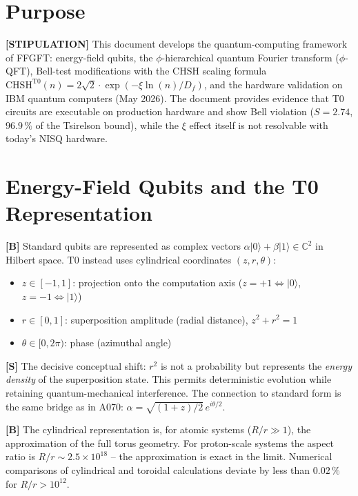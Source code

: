 \section{Purpose}

\textbf{[STIPULATION]} This document develops the quantum-computing framework of
FFGFT: energy-field qubits, the $\phi$-hierarchical quantum Fourier transform
($\phi$-QFT), Bell-test modifications with the CHSH scaling formula
$\text{CHSH}^{\text{T0}}(n) = 2\sqrt{2}\cdot\exp(-\xi\ln(n)/D_f)$, and the
hardware validation on IBM quantum computers (May 2026). The document provides
evidence that T0 circuits are executable on production hardware and show Bell
violation ($S=2{.}74$, $96{.}9\,\%$ of the Tsirelson bound), while the $\xi$
effect itself is not resolvable with today's NISQ hardware.

\section{Energy-Field Qubits and the T0 Representation}

\textbf{[B]} Standard qubits are represented as complex vectors
$\alpha|0\rangle+\beta|1\rangle\in\mathbb{C}^2$ in Hilbert space. T0 instead
uses cylindrical coordinates $(z,r,\theta)$:

\begin{itemize}[leftmargin=2em,itemsep=2pt,topsep=2pt]
  \item $z\in[-1,1]$: projection onto the computation axis ($z=+1
        \Leftrightarrow|0\rangle$, $z=-1\Leftrightarrow|1\rangle$)
  \item $r\in[0,1]$: superposition amplitude (radial distance), $z^2+r^2=1$
  \item $\theta\in[0,2\pi)$: phase (azimuthal angle)
\end{itemize}

\textbf{[S]} The decisive conceptual shift: $r^2$ is not a probability but
represents the \emph{energy density} of the superposition state. This permits
deterministic evolution while retaining quantum-mechanical interference. The
connection to standard form is the same bridge as in A070:
$\alpha=\sqrt{(1+z)/2}\,e^{i\theta/2}$.

\textbf{[B]} The cylindrical representation is, for atomic systems ($R/r\gg1$),
the approximation of the full torus geometry. For proton-scale systems the aspect
ratio is $R/r\sim2{.}5\times10^{18}$ -- the approximation is exact in the limit.
Numerical comparisons of cylindrical and toroidal calculations deviate by less
than $0{.}02\,\%$ for $R/r>10^{12}$.

